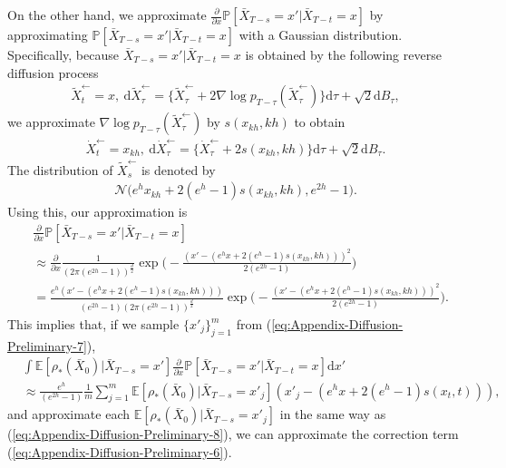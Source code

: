 On the other hand, we approximate $\frac{\partial}{\partial x}\mathbb{P}[\bar{X}_{T-s}=x'|\bar{X}_{T-t}=x]$ by approximating $\mathbb{P}[\bar{X}_{T-s}=x'|\bar{X}_{T-t}=x]$ with a Gaussian distribution.
Specifically, because $\bar{X}_{T-s}=x'|\bar{X}_{T-t}=x$ is obtained by the following reverse diffusion process
\begin{align}
    \tilde{X}_{t}^\leftarrow=x,\ \mathrm{d}\tilde{X}_{\tau}^\leftarrow = \{\tilde{X}_{\tau}^\leftarrow + 2\nabla \log p_{T-\tau}(\tilde{X}_{\tau}^\leftarrow)\}\mathrm{d}\tau + \sqrt{2}\mathrm{d}B_\tau,
\end{align}
we approximate $\nabla \log p_{T-\tau}(\tilde{X}_{\tau}^\leftarrow)$ by $s(x_{kh},kh)$ to obtain
\begin{align}
    \dot{X}_{t}^\leftarrow=x_{kh},\ \mathrm{d}\dot{X}_{\tau}^\leftarrow = \{\dot{X}_{\tau}^\leftarrow + 2s(x_{kh},kh)\}\mathrm{d}\tau + \sqrt{2}\mathrm{d}B_\tau.
\end{align}
The distribution of $\tilde{X}_{s}^\leftarrow$ is denoted by
\begin{align}
    \mathcal{N}\big(e^h x_{kh} + 2(e^h-1)s(x_{kh},kh), e^{2h} - 1\big).
     \label{eq:Appendix-Diffusion-Preliminary-7}
\end{align}
Using this, our approximation is
\begin{align}
   & \frac{\partial}{\partial x}\mathbb{P}[\bar{X}_{T-s}=x'|\bar{X}_{T-t}=x]
   \\ & \approx 
    \frac{\partial}{\partial x}\frac{1}{(2\pi (e^{2h} - 1))^\frac{d}{2}}
    \exp\bigg(-\frac{(x'-(e^h x + 2(e^h-1)s(x_{kh},kh)))^2}{2(e^{2h} - 1)}\bigg)
    \\ & = \frac{e^h(x'-(e^h x + 2(e^h-1)s(x_{kh},kh)))}{(e^{2h} - 1)(2\pi (e^{2h} - 1))^\frac{d}{2}}
    \exp\bigg(-\frac{(x'-(e^h x + 2(e^h-1)s(x_{kh},kh)))^2}{2(e^{2h} - 1)}\bigg).
\end{align}
This implies that, if we sample $\{x'_{j}\}_{j=1}^m$ from (\ref{eq:Appendix-Diffusion-Preliminary-7}),
\begin{align}
  &  \int
        \mathbb{E}[\rho_*(\bar{X}_0)|\bar{X}_{T-s}=x']
        \frac{\partial}{\partial x}\mathbb{P}[\bar{X}_{T-s}=x'|\bar{X}_{T-t}=x]\mathrm{d}x'
  \\ &  \approx \frac{e^h}{(e^{2h} - 1)}\frac1m\sum_{j=1}^m \mathbb{E}[\rho_*(\bar{X}_0)|\bar{X}_{T-s}=x'_j] (x'_{j}-(e^h x + 2(e^h-1)s(x_{t},t))),
\end{align}
and approximate each $\mathbb{E}[\rho_*(\bar{X}_0)|\bar{X}_{T-s}=x'_j]$ in the same way as (\ref{eq:Appendix-Diffusion-Preliminary-8}), we can approximate the correction term (\ref{eq:Appendix-Diffusion-Preliminary-6}). 



